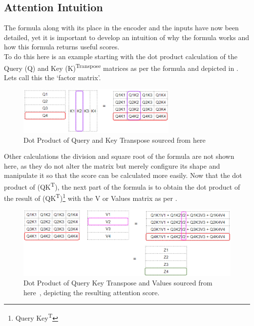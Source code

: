 \subsection{Attention Intuition}
The formula along with its place in the encoder and the inputs have now been detailed, yet it is important to develop an intuition of
why the formula works and how this formula returns useful scores.\\
To do this here is an example starting with the dot product calculation of the Query (Q) and Key (K)\textsuperscript{Transpose} matrices
as per the formula and depicted in . Lets call this the `factor matrix'.
\begin{figure}[H]
	\centering
	\includegraphics[width=0.7\textwidth]{figures/dot_prodct_q_kt.png}
	\caption{Dot Product of Query and Key Transpose sourced from here~\autocite{doshiTransformersExplainedVisually2021b}}
	\label{fig:q_kt_dot_product}
\end{figure}
Other calculations the division and square root of the formula are not shown here, as they do not alter the matrix but merely configure its
shape and manipulate it so that the score can be calculated more easily.
\bigbreak
Now that the dot product of (QK\textsuperscript{T}), the next part of the formula is to obtain the
dot product of the result of (QK\textsuperscript{T})\footnote{Query Key\textsuperscript{T}} with the V or Values matrix as per .
\begin{figure}[H]
	\centering
	\includegraphics[width=1\textwidth]{figures/qk_v_dot_product.png}
	\caption{Dot Product of Query Key Transpose and Values sourced from here~\autocite{doshiTransformersExplainedVisually2021b}, depicting the
		resulting attention score.}
	\label{fig:qk_v_dot_product}
\end{figure}
